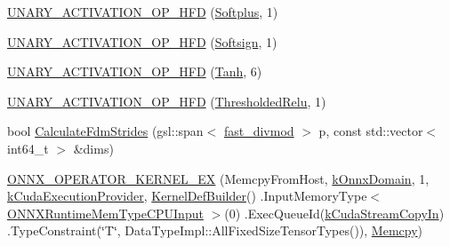 \begin{DoxyCompactItemize}
\item 
\mbox{\hyperlink{namespaceonnxruntime_1_1cuda_a27945ae6c6e8e255a9ddc9aa7a610689}{U\+N\+A\+R\+Y\+\_\+\+A\+C\+T\+I\+V\+A\+T\+I\+O\+N\+\_\+\+O\+P\+\_\+\+H\+FD}} (\mbox{\hyperlink{classonnxruntime_1_1cuda_1_1Softplus}{Softplus}}, 1)
\item 
\mbox{\hyperlink{namespaceonnxruntime_1_1cuda_a4532ab2283a50365c6344add0cecea3f}{U\+N\+A\+R\+Y\+\_\+\+A\+C\+T\+I\+V\+A\+T\+I\+O\+N\+\_\+\+O\+P\+\_\+\+H\+FD}} (\mbox{\hyperlink{classonnxruntime_1_1cuda_1_1Softsign}{Softsign}}, 1)
\item 
\mbox{\hyperlink{namespaceonnxruntime_1_1cuda_a44e2351ef5877b867e78d45d1c1b32e0}{U\+N\+A\+R\+Y\+\_\+\+A\+C\+T\+I\+V\+A\+T\+I\+O\+N\+\_\+\+O\+P\+\_\+\+H\+FD}} (\mbox{\hyperlink{classonnxruntime_1_1cuda_1_1Tanh}{Tanh}}, 6)
\item 
\mbox{\hyperlink{namespaceonnxruntime_1_1cuda_a7d61a8374b53d76a0638f4a647d45cf7}{U\+N\+A\+R\+Y\+\_\+\+A\+C\+T\+I\+V\+A\+T\+I\+O\+N\+\_\+\+O\+P\+\_\+\+H\+FD}} (\mbox{\hyperlink{classonnxruntime_1_1cuda_1_1ThresholdedRelu}{Thresholded\+Relu}}, 1)
\item 
bool \mbox{\hyperlink{namespaceonnxruntime_1_1cuda_ad1695824538013a3c72989f1a78ce5ec}{Calculate\+Fdm\+Strides}} (gsl\+::span$<$ \mbox{\hyperlink{classonnxruntime_1_1cuda_1_1fast__divmod}{fast\+\_\+divmod}} $>$ p, const std\+::vector$<$ int64\+\_\+t $>$ \&dims)
\item 
\mbox{\hyperlink{namespaceonnxruntime_1_1cuda_ad1e8ff4e5716a990bc5ea840f4900490}{O\+N\+N\+X\+\_\+\+O\+P\+E\+R\+A\+T\+O\+R\+\_\+\+K\+E\+R\+N\+E\+L\+\_\+\+EX}} (Memcpy\+From\+Host, \mbox{\hyperlink{namespaceonnxruntime_ac0e7c0c106a2c9e9594560a3ab289fa0}{k\+Onnx\+Domain}}, 1, \mbox{\hyperlink{namespaceonnxruntime_a73ebc64887ddd1968e3cef47ffefe35b}{k\+Cuda\+Execution\+Provider}}, \mbox{\hyperlink{classonnxruntime_1_1KernelDefBuilder}{Kernel\+Def\+Builder}}() .Input\+Memory\+Type$<$ \mbox{\hyperlink{allocator__info_8h_add3f8ee3ff93395704abae71c30cab18a3127507f1d160fd6348370cc7bd42245}{O\+N\+N\+X\+Runtime\+Mem\+Type\+C\+P\+U\+Input}} $>$(0) .Exec\+Queue\+Id(\mbox{\hyperlink{namespaceonnxruntime_a43d7a39c044fbc3f2147feb0f958dfc5a40d087c7c878c70ebf65562fe6e2ad4c}{k\+Cuda\+Stream\+Copy\+In}}) .Type\+Constraint(\char`\"{}T\char`\"{}, Data\+Type\+Impl\+::\+All\+Fixed\+Size\+Tensor\+Types()), \mbox{\hyperlink{classonnxruntime_1_1Memcpy}{Memcpy}})
\item 

\end{DoxyCompactItemize}
